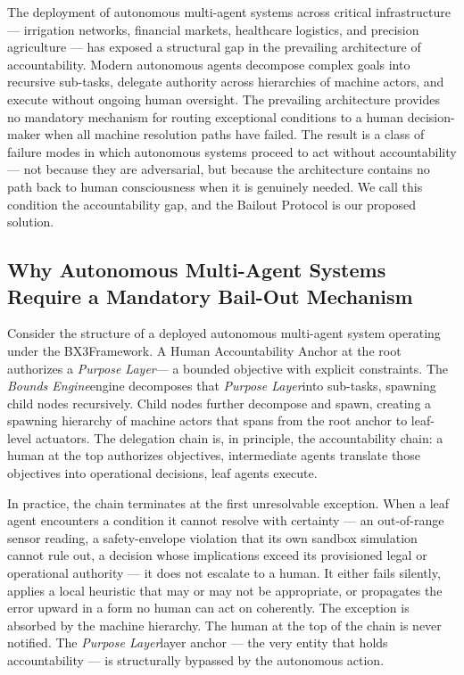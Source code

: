 \documentclass[12pt]{article}
\newcommand{\bxthree}{\mbox{BX3}}
\newcommand{\purpose}{\textit{Purpose Layer}}
\newcommand{\bounds}{\textit{Bounds Engine}}
\begin{document}
The deployment of autonomous multi-agent systems across critical infrastructure — irrigation networks, financial markets, healthcare logistics, and precision agriculture — has exposed a structural gap in the prevailing architecture of accountability. Modern autonomous agents decompose complex goals into recursive sub-tasks, delegate authority across hierarchies of machine actors, and execute without ongoing human oversight. The prevailing architecture provides no mandatory mechanism for routing exceptional conditions to a human decision-maker when all machine resolution paths have failed. The result is a class of failure modes in which autonomous systems proceed to act without accountability — not because they are adversarial, but because the architecture contains no path back to human consciousness when it is genuinely needed. We call this condition the accountability gap, and the Bailout Protocol is our proposed solution.

\subsection{Why Autonomous Multi-Agent Systems Require a Mandatory Bail-Out Mechanism}

Consider the structure of a deployed autonomous multi-agent system operating under the \bxthree Framework. A Human Accountability Anchor at the root authorizes a \purpose — a bounded objective with explicit constraints. The \bounds engine decomposes that \purpose into sub-tasks, spawning child nodes recursively. Child nodes further decompose and spawn, creating a spawning hierarchy of machine actors that spans from the root anchor to leaf-level actuators. The delegation chain is, in principle, the accountability chain: a human at the top authorizes objectives, intermediate agents translate those objectives into operational decisions, leaf agents execute.

In practice, the chain terminates at the first unresolvable exception. When a leaf agent encounters a condition it cannot resolve with certainty — an out-of-range sensor reading, a safety-envelope violation that its own sandbox simulation cannot rule out, a decision whose implications exceed its provisioned legal or operational authority — it does not escalate to a human. It either fails silently, applies a local heuristic that may or may not be appropriate, or propagates the error upward in a form no human can act on coherently. The exception is absorbed by the machine hierarchy. The human at the top of the chain is never notified. The \purpose layer anchor — the very entity that holds accountability — is structurally bypassed by the autonomous action.
\end{document}
